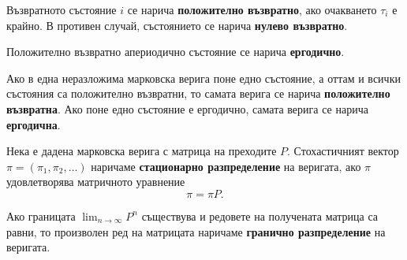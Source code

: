 \documentclass{../../common/topic}
\begin{document}
\begin{definition}
  Възвратното състояние \( i \) се нарича \textbf{положително възвратно}, ако очакването \( \tau_i \) е крайно. В противен случай, състоянието се нарича \textbf{нулево възвратно}.

  Положително възвратно апериодично състояние се нарича \textbf{ергодично}.

  Ако в една неразложима марковска верига поне едно състояние, а оттам и всички състояния са положително възвратни, то самата верига се нарича \textbf{положително възвратна}. Ако поне едно състояние е ергодично, самата верига се нарича \textbf{ергодична}.
\end{definition}

\begin{definition}
  Нека е дадена марковска верига с матрица на преходите \( P \). Стохастичният вектор \( \pi = (\pi_1, \pi_2, \ldots) \) наричаме \textbf{стационарно разпределение} на веригата, ако \( \pi \) удовлетворява матричното уравнение
  \begin{equation*}
    \pi = \pi P.
  \end{equation*}

  Ако границата \( \lim_{n \to \infty} P^n \) съществува и редовете на получената матрица са равни, то произволен ред на матрицата наричаме \textbf{гранично разпределение} на веригата.
\end{definition}
\end{document}

